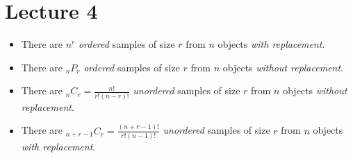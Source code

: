\documentclass[class=article, crop=false]{standalone}
\begin{document}
  \section{Lecture 4}
  \begin{itemize}
    \item There are $n^r$ \emph{ordered} samples of size $r$ from $n$ objects \emph{with replacement}.
    \item There are $\phantom{}_nP_r$ \emph{ordered} samples of size $r$ from $n$ objects \emph{without replacement}.
    \item There are $\phantom{}_nC_r = \frac{n!}{r!(n - r)!}$ \emph{unordered} samples of size $r$ from $n$ objects \emph{without replacement}.
    \item There are $\phantom{}_{n + r - 1}C_r = \frac{(n + r - 1)!}{r!(n - 1)!}$ \emph{unordered} samples of size $r$ from $n$ objects \emph{with replacement}.
  \end{itemize}
\end{document}
